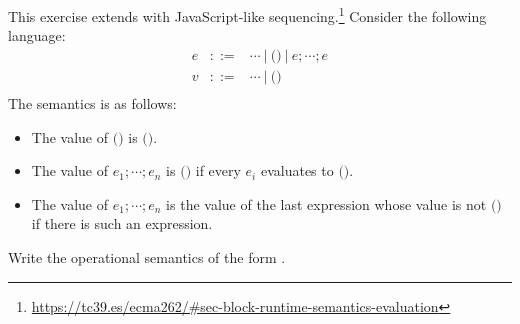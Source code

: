 \begin{exercise}

This exercise extends \Lang with JavaScript-like
sequencing.\footnote{\url{https://tc39.es/ecma262/\#sec-block-runtime-semantics-evaluation}}
Consider the following language:
\[
  \begin{array}{rrl}
    e & ::= & \cdots\ |\ \textsf{()}\ |\ e;\cdots;e \\
    v & ::= & \cdots\ |\ \textsf{()} \\
  \end{array}
\]
The semantics is as follows:
\begin{itemize}
  \item
The value of $\textsf{()}$ is $\textsf{()}$.
  \item
The value of $e_1;\cdots;e_n$ is $\textsf{()}$
if every $e_i$ evaluates to $\textsf{()}$.
  \item
The value of $e_1;\cdots;e_n$
is the value of the last expression whose value is not $\textsf{()}$
if there is such an expression.
\end{itemize}
Write the operational semantics of the form .

\end{exercise}
